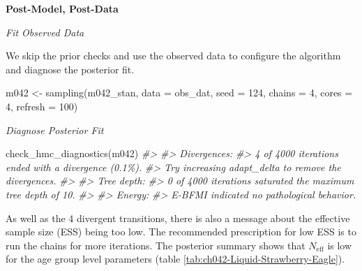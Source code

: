 \documentclass[11pt, oneside, openany]{scrbook}
\newenvironment{Shaded}{\begin{snugshade}}{\end{snugshade}}
\newcommand{\AttributeTok}[1]{\textcolor[rgb]{0.77,0.63,0.00}{#1}}
\newcommand{\CommentTok}[1]{\textcolor[rgb]{0.56,0.35,0.01}{\textit{#1}}}
\newcommand{\DecValTok}[1]{\textcolor[rgb]{0.00,0.00,0.81}{#1}}
\newcommand{\FunctionTok}[1]{\textcolor[rgb]{0.00,0.00,0.00}{#1}}
\newcommand{\NormalTok}[1]{#1}
\newcommand{\OtherTok}[1]{\textcolor[rgb]{0.56,0.35,0.01}{#1}}
\begin{document}
\textbf{Post-Model, Post-Data}

\emph{Fit Observed Data}

We skip the prior checks and use the observed data to configure the algorithm and diagnose the posterior fit.


\begin{Shaded}
\begin{Highlighting}[]
\NormalTok{m042 }\OtherTok{\textless{}{-}} \FunctionTok{sampling}\NormalTok{(m042\_stan, }\AttributeTok{data =}\NormalTok{ obs\_dat, }\AttributeTok{seed =} \DecValTok{124}\NormalTok{,}
                 \AttributeTok{chains =} \DecValTok{4}\NormalTok{, }\AttributeTok{cores =} \DecValTok{4}\NormalTok{, }\AttributeTok{refresh =} \DecValTok{100}\NormalTok{)}
\end{Highlighting}
\end{Shaded}


\emph{Diagnose Posterior Fit}


\begin{Shaded}
\begin{Highlighting}[]
\FunctionTok{check\_hmc\_diagnostics}\NormalTok{(m042)}
\CommentTok{\#\textgreater{} }
\CommentTok{\#\textgreater{} Divergences:}
\CommentTok{\#\textgreater{} 4 of 4000 iterations ended with a divergence (0.1\%).}
\CommentTok{\#\textgreater{} Try increasing \textquotesingle{}adapt\_delta\textquotesingle{} to remove the divergences.}
\CommentTok{\#\textgreater{} }
\CommentTok{\#\textgreater{} Tree depth:}
\CommentTok{\#\textgreater{} 0 of 4000 iterations saturated the maximum tree depth of 10.}
\CommentTok{\#\textgreater{} }
\CommentTok{\#\textgreater{} Energy:}
\CommentTok{\#\textgreater{} E{-}BFMI indicated no pathological behavior.}
\end{Highlighting}
\end{Shaded}


As well as the 4 divergent transitions, there is also a message about the effective sample size (ESS) being too low. The recommended prescription for low ESS is to run the chains for more iterations. The posterior summary shows that \(N_{\mathrm{eff}}\) is low for the age group level parameters (table \ref{tab:ch042-Liquid-Strawberry-Eagle}).
\end{document}
